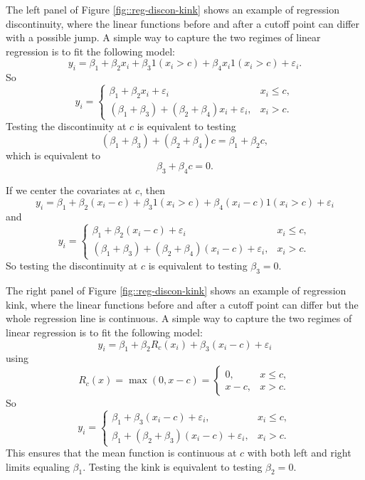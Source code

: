The left panel of Figure \ref{fig::reg-discon-kink} shows an example of regression discontinuity, where the linear functions before and after a cutoff point can differ with a possible jump. A simple way to capture the two regimes of linear regression is to fit the following model: 
\[
y_{i}=\beta_{1}+\beta_{2}x_{i}+\beta_{3}1\left(x_{i}>c\right)+\beta_{4}x_{i}1\left(x_{i}>c\right)+\varepsilon_{i}.
\]
So 
\[
y_{i}=\begin{cases}
\beta_{1}+\beta_{2}x_{i}+\varepsilon_{i} & x_{i}\leq c,\\
\left(\beta_{1}+\beta_{3}\right)+\left(\beta_{2}+\beta_{4}\right)x_{i}+\varepsilon_{i}, & x_{i}>c.
\end{cases}
\]
Testing the discontinuity at $c$ is equivalent to testing
\[
\left(\beta_{1}+\beta_{3}\right)+\left(\beta_{2}+\beta_{4}\right)c=\beta_{1}+\beta_{2}c ,
\]
which is equivalent to
\[
\beta_{3}+\beta_{4}c=0.
\]

If we center the covariates at $c$, then 
\[
y_{i}=\beta_{1}+\beta_{2}(x_{i}-c)+\beta_{3}1\left(x_{i}>c\right)+\beta_{4}(x_{i}-c)1\left(x_{i}>c\right)+\varepsilon_{i}
\]
and
\[
y_{i}=\begin{cases}
\beta_{1}+\beta_{2}(x_{i}-c)+\varepsilon_{i} & x_{i}\leq c,\\
\left(\beta_{1}+\beta_{3}\right)+\left(\beta_{2}+\beta_{4}\right)(x_{i}-c)+\varepsilon_{i}, & x_{i}>c.
\end{cases}
\]
So testing the discontinuity at $c$ is equivalent to testing $\beta_{3}=0$. 

The right panel of Figure \ref{fig::reg-discon-kink} shows an example of regression kink, where the linear functions before and after a cutoff point can differ but the whole regression line is continuous. A simple way to capture the two regimes of linear regression is to fit the following model: 
\[
y_{i}=\beta_{1}+\beta_{2}R_{c}(x_{i})+\beta_{3}(x_{i}-c)+\varepsilon_{i}
\]
using  
\[
R_{c}(x)=\max(0,x-c)=\begin{cases}
0, & x\leq c,\\
x-c, & x>c.
\end{cases}
\]
So 
\[
y_{i}=\begin{cases}
\beta_{1}+\beta_{3}(x_{i}-c)+\varepsilon_{i}, & x_{i}\leq c,\\
\beta_{1}+\left(\beta_{2}+\beta_{3}\right)(x_{i}-c)+\varepsilon_{i}, & x_{i}>c.
\end{cases}
\]
This ensures that the mean function is continuous at $c$ with both
left and right limits equaling $\beta_{1}$. Testing the kink is equivalent
to testing $\beta_{2}=0.$


